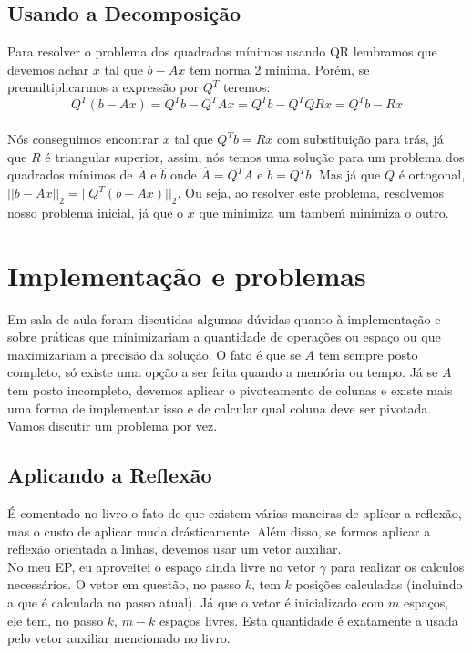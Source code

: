 \documentclass[
10pt, %
a4paper, %
oneside, %
headinclude,footinclude, %
BCOR5mm, %
]{scrartcl}
\begin{document}
\subsection{Usando a Decomposição}
Para resolver o problema dos quadrados mínimos usando QR lembramos que devemos achar $x$ tal que $b-Ax$ tem norma 2 mínima. Porém, se premultiplicarmos a expressão por $Q^T$ teremos: \\
$$ Q^T(b-Ax) = Q^Tb - Q^TAx = Q^Tb - Q^TQRx = Q^Tb - Rx$$ \\
Nós conseguimos encontrar $x$ tal que $Q^Tb = Rx$ com substituição para trás, já que $R$ é triangular superior, assim, nós temos uma solução para um problema dos quadrados mínimos de $\hat{A}$ e $\hat{b}$ onde $\hat{A} = Q^TA$ e $\hat{b} = Q^Tb$. Mas já que $Q$ é ortogonal, $||b-Ax||_2 = ||Q^T(b-Ax)||_2$. Ou seja, ao resolver este problema, resolvemos nosso problema inicial, já que o $x$ que minimiza um tambeḿ minimiza o outro.

\section{Implementação e problemas}
Em sala de aula foram discutidas algumas dúvidas quanto à implementação e sobre práticas que minimizariam a quantidade de operações ou espaço ou que maximizariam a precisão da solução. O fato é que se $A$ tem sempre posto completo, só existe uma opção a ser feita quando a memória ou tempo. Já se $A$ tem posto incompleto, devemos aplicar o pivoteamento de colunas e existe mais uma forma de implementar isso e de calcular qual coluna deve ser pivotada. Vamos discutir um problema por vez.

\subsection{Aplicando a Reflexão}
É comentado no livro o fato de que existem várias maneiras de aplicar a reflexão, mas o custo de aplicar muda drásticamente. Além disso, se formos aplicar a reflexão orientada a linhas, devemos usar um vetor auxiliar. \\
No meu EP, eu aproveitei o espaço ainda livre no vetor $\gamma$ para realizar os calculos necessários. O vetor em questão, no passo $k$, tem $k$ posições calculadas (incluindo a que é calculada no passo atual). Já que o vetor é inicializado com $m$ espaços, ele tem, no passo $k$, $m-k$ espaços livres. Esta quantidade é exatamente a usada pelo vetor auxiliar mencionado no livro.
 
\end{document}

